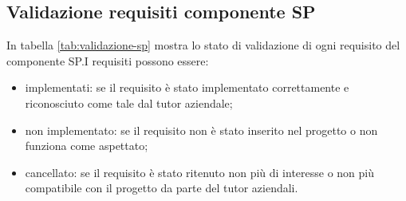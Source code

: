 \subsection{Validazione requisiti componente SP}
In tabella \ref{tab:validazione-sp} mostra lo stato di validazione di ogni requisito del componente SP.I requisiti possono essere:
\begin{itemize}
    \item implementati: se il requisito è stato implementato correttamente e riconosciuto come tale dal tutor aziendale;
    \item non implementato: se il requisito non è stato inserito nel progetto o non funziona come aspettato;
    \item cancellato: se il requisito è stato ritenuto non più di interesse o non più compatibile con il progetto da parte del tutor aziendali.
\end{itemize}
